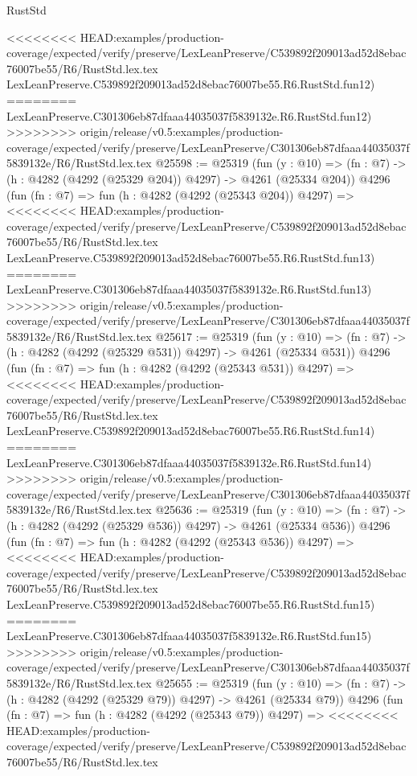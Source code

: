 \begin{lexlean}{RustStd}
\begin{coremodule}
{\begin{coremodule}
{{{{{{{{{{{{{{{{{{{{{{{{{{{{{{{{{{{<<<<<<<< HEAD:examples/production-coverage/expected/verify/preserve/LexLeanPreserve/C539892f209013ad52d8ebac76007be55/R6/RustStd.lex.tex
    LexLeanPreserve.C539892f209013ad52d8ebac76007be55.R6.RustStd.fun12)
========
    LexLeanPreserve.C301306eb87dfaaa44035037f5839132e.R6.RustStd.fun12)
>>>>>>>> origin/release/v0.5:examples/production-coverage/expected/verify/preserve/LexLeanPreserve/C301306eb87dfaaa44035037f5839132e/R6/RustStd.lex.tex
@25598 := @25319
    (fun (y : @10) => (fn : @7) -> (h : @4282 (@4292 (@25329 @204)) @4297) -> @4261 (@25334 @204))
    @4296
    (fun (fn : @7) =>
    fun (h : @4282 (@4292 (@25343 @204)) @4297) =>
<<<<<<<< HEAD:examples/production-coverage/expected/verify/preserve/LexLeanPreserve/C539892f209013ad52d8ebac76007be55/R6/RustStd.lex.tex
    LexLeanPreserve.C539892f209013ad52d8ebac76007be55.R6.RustStd.fun13)
========
    LexLeanPreserve.C301306eb87dfaaa44035037f5839132e.R6.RustStd.fun13)
>>>>>>>> origin/release/v0.5:examples/production-coverage/expected/verify/preserve/LexLeanPreserve/C301306eb87dfaaa44035037f5839132e/R6/RustStd.lex.tex
@25617 := @25319
    (fun (y : @10) => (fn : @7) -> (h : @4282 (@4292 (@25329 @531)) @4297) -> @4261 (@25334 @531))
    @4296
    (fun (fn : @7) =>
    fun (h : @4282 (@4292 (@25343 @531)) @4297) =>
<<<<<<<< HEAD:examples/production-coverage/expected/verify/preserve/LexLeanPreserve/C539892f209013ad52d8ebac76007be55/R6/RustStd.lex.tex
    LexLeanPreserve.C539892f209013ad52d8ebac76007be55.R6.RustStd.fun14)
========
    LexLeanPreserve.C301306eb87dfaaa44035037f5839132e.R6.RustStd.fun14)
>>>>>>>> origin/release/v0.5:examples/production-coverage/expected/verify/preserve/LexLeanPreserve/C301306eb87dfaaa44035037f5839132e/R6/RustStd.lex.tex
@25636 := @25319
    (fun (y : @10) => (fn : @7) -> (h : @4282 (@4292 (@25329 @536)) @4297) -> @4261 (@25334 @536))
    @4296
    (fun (fn : @7) =>
    fun (h : @4282 (@4292 (@25343 @536)) @4297) =>
<<<<<<<< HEAD:examples/production-coverage/expected/verify/preserve/LexLeanPreserve/C539892f209013ad52d8ebac76007be55/R6/RustStd.lex.tex
    LexLeanPreserve.C539892f209013ad52d8ebac76007be55.R6.RustStd.fun15)
========
    LexLeanPreserve.C301306eb87dfaaa44035037f5839132e.R6.RustStd.fun15)
>>>>>>>> origin/release/v0.5:examples/production-coverage/expected/verify/preserve/LexLeanPreserve/C301306eb87dfaaa44035037f5839132e/R6/RustStd.lex.tex
@25655 := @25319
    (fun (y : @10) => (fn : @7) -> (h : @4282 (@4292 (@25329 @79)) @4297) -> @4261 (@25334 @79))
    @4296
    (fun (fn : @7) =>
    fun (h : @4282 (@4292 (@25343 @79)) @4297) =>
<<<<<<<< HEAD:examples/production-coverage/expected/verify/preserve/LexLeanPreserve/C539892f209013ad52d8ebac76007be55/R6/RustStd.lex.tex
}}}}}}}}}}}}}}}}}}}}}}}}}}}}}}}}}}}
\end{coremodule}}
\end{coremodule}
\end{lexlean}
